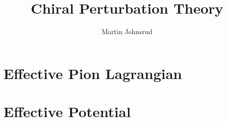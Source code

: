 \documentclass{article}
\title{Chiral Perturbation Theory}
\author{Martin Johnsrud}
\begin{document}
\maketitle 

\section{Effective Pion Lagrangian}


% 
% 

\section{Effective Potential}



% 
% 
% 
% 
% 
% 




\clearpage


\end{document}

